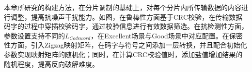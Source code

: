 
本章所研究的构建方法，在分片调制的基础上，对每个分片内所传输数据的内容进行调整，提高抗噪声干扰能力。如图，在鲁棒性方面基于CRC校验，在传输数据码字的过程中穿插校验码字，通过校验信息进行有效数据筛选。在抗检测性方面，参数设置支持不同的$L_{Codeword}$，在Excellent场景与Good场景中对应配置。在保密性方面，引入Zigzag映射矩阵，在码字与符号之间添加一层转换，并且配合初始化参数实现映射矩阵的随机化；同时，在计算CRC校验值时，添加盐值增加结果的随机程度，提高反向破解难度。